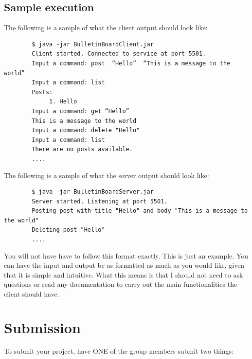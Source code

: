 \documentclass{article}
\newenvironment{commandline}{
	\medskip
	\begin{mdframed}[style=commandline]
}{
	\end{mdframed}
	\medskip
}
\begin{document}
\subsection*{Sample execution}
The following is a sample of what the client output should look like:
\begin{commandline}
	\begin{verbatim}
		$ java -jar BulletinBoardClient.jar
		Client started. Connected to service at port 5501.
		Input a command: post  “Hello”  “This is a message to the world”
		Input a command: list
		Posts:
		     1. Hello
		Input a command: get “Hello”
		This is a message to the world
		Input a command: delete "Hello"
		Input a command: list
		There are no posts available.
		....
	\end{verbatim}
\end{commandline}
The following is a sample of what the server output should look like:
\begin{commandline}
	\begin{verbatim}
		$ java -jar BulletinBoardServer.jar
		Server started. Listening at port 5501.
		Posting post with title "Hello" and body "This is a message to the world"
		Deleting post "Hello"
		....
	\end{verbatim}
\end{commandline}
You will not have have to follow this format exactly. This is just an example. You can have the input and output be as formatted as much as you would like, given that it is simple and intuitive. What this means is that I should not need to ask questions or read any documentation to carry out the main functionalities the client should have.  




\section{Submission } %
To submit your project, have ONE of the group members submit two things:
\end{document}
